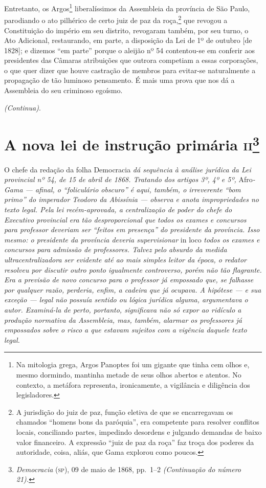 Entretanto, os Argos\footnote{Na mitologia grega, Argos Panoptes foi
  um gigante que tinha cem olhos e, mesmo dormindo, mantinha metade de
  seus olhos abertos e atentos. No contexto, a metáfora representa,
  ironicamente, a vigilância e diligência dos legisladores.}
liberalíssimos da Assembleia da província de São Paulo, parodiando o ato
pilhérico de certo juiz de paz da roça,\footnote{A jurisdição do juiz
  de paz, função eletiva de que se encarregavam os chamados ``homens bons
  da paróquia'', era competente para resolver conflitos locais,
  conciliando partes, impedindo desordens e julgando demandas de baixo
  valor financeiro. A expressão ``juiz de paz da roça'' faz troça dos
  poderes da autoridade, coisa, aliás, que Gama explorou como poucos.}
que revogou a Constituição do império em seu distrito, revogaram também,
por seu turno, o Ato Adicional, restaurando, em parte, a disposição da
Lei de 1º de outubro {[}de 1828{]}; e dizemos ``em parte'' porque o
aleijão nº 54 contentou-se em conferir aos presidentes das Câmaras
atribuições que outrora competiam a essas corporações, o que quer dizer
que houve castração de membros para evitar-se naturalmente a propagação
de tão luminoso pensamento. É mais uma prova que nos dá a Assembleia do
seu criminoso egoísmo.

\emph{(Continua)}.

\chapter{A nova lei de instrução primária \textsc{ii}\footnote{\emph{Democracia} (\textsc{sp}), 09 de maio de 1868, pp.~1--2 \emph{(Continuação do
  número 21).}}}

\begin{didascalia}
O chefe da redação da folha Democracia \emph{dá sequência à análise
jurídica da Lei provincial nº 54, de 15 de abril de 1868. Tratando dos artigos
3º, 4º e 5º,} Afro\emph{-Gama --- afinal, o ``foliculário obscuro'' é
aqui, também, o irreverente ``bom primo'' do imperador Teodoro da
Abissínia --- observa e anota impropriedades no texto legal. Pela lei
recém-aprovada, a centralização de poder do chefe do Executivo
provincial era tão desproporcional que todos os exames e concursos para
professor deveriam ser ``feitos em presença'' do presidente da província.
Isso mesmo: o presidente da província deveria supervisionar} in loco
\emph{todos os exames e concursos para admissão de professores. Talvez
pelo absurdo da medida ultracentralizadora ser evidente até ao mais
simples leitor da época, o redator resolveu por discutir outro ponto
igualmente controverso, porém não tão flagrante. Era a previsão de novo
concurso para o professor já empossado que, se falhasse por qualquer
razão, perderia, enfim, a cadeira que já ocupava. A hipótese --- e sua
exceção --- legal não possuía sentido ou lógica jurídica alguma,
argumentava o autor. Examiná-la de perto, portanto, significava não só
expor ao ridículo a produção normativa da Assembleia, mas, também,
alarmar os professores já empossados sobre o risco a que estavam
sujeitos com a vigência daquele texto legal.}
\end{didascalia}



